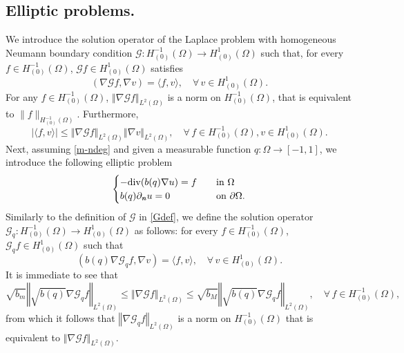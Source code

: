 \documentclass[11pt,reqno]{amsart}
\theoremstyle{remark}
\newcommand \norm[1] {\left\Vert #1\right\Vert}
\def\n{\textbf{\textit{n}}}
\def\G{\mathcal{G}}
\def \l {\langle}
\def \r {\rangle}
\def\div{\mathrm{div}}
\numberwithin{equation}{section}
\begin{document}
\subsection{Elliptic problems.} 
We introduce the solution operator of the Laplace problem with homogeneous Neumann boundary condition $\G: H^{-1}_{(0)}(\Omega) \to H^{1}_{(0)}(\Omega)$ such that, for every $f \in H^{-1}_{(0)}(\Omega)$,  $\G f \in H^{1}_{(0)}(\Omega)$ satisfies
\begin{equation}\label{Gdef}%
(\nabla \G f, \nabla v) = \l f, v \r, \quad \forall \, v \in H^{1}_{(0)}(\Omega).
\end{equation}
For any $f \in H^{-1}_{(0)}(\Omega)$, $\norm{\nabla \G f}_{L^2(\Omega)}$ is a norm on $H^{-1}_{(0)}(\Omega)$, that is equivalent to $\| f\|_{H^{-1}_{(0)}(\Omega)}$. Furthermore,
\begin{equation}\label{interp}
| \l f, v \r | \leq  \norm{\nabla \G f}_{L^2(\Omega)} \norm{\nabla v}_{L^2(\Omega)}, \quad \forall \, f \in H^{-1}_{(0)}(\Omega), v \in H^{1}_{(0)}(\Omega).
\end{equation}
Next, assuming \eqref{m-ndeg} and given a measurable function $q: \Omega \to [-1,1]$, we introduce the following elliptic problem
\begin{equation}\label{epgq}
\begin{cases}
-\div(b(q) \nabla u) = f \quad & \text{in}\ \Omega \\
b(q) \partial_\n u = 0 \quad & \text{on} \ \partial\Omega.
\end{cases}
\end{equation}
Similarly to the definition of $\G$ in \eqref{Gdef}, we define the solution operator $\G_q:  H^{-1}_{(0)}(\Omega)  \to  H^{1}_{(0)}(\Omega)$ as follows:
for every $f \in H^{-1}_{(0)}(\Omega)$,  $\G_q f \in H^{1}_{(0)}(\Omega)$ such that
\begin{equation}\label{def G_q}
( b(q) \nabla \G_q f ,\nabla v ) = \l f, v \r, \quad \forall \, v \in  H^{1}_{(0)}(\Omega).
\end{equation}
It is immediate to see that
\begin{equation}\label{equivalence of norm}
\sqrt{b_m} \norm{\sqrt{b(q)} \nabla \G_q f}_{L^2(\Omega)}
\le \norm{ \nabla \G f}_{L^2(\Omega)}
\le \sqrt{b_M}\norm{\sqrt{b(q)} \nabla \G_q f}_{L^2(\Omega)}\!, \quad \forall \, f \in  H^{-1}_{(0)}(\Omega),
\end{equation}
from which it follows that $\norm{\nabla \G_q f}_{L^2(\Omega)}$ is a norm on $ H^{-1}_{(0)}(\Omega)$ that is equivalent to $\norm{\nabla \G f}_{L^2(\Omega)}$.
\end{document}
